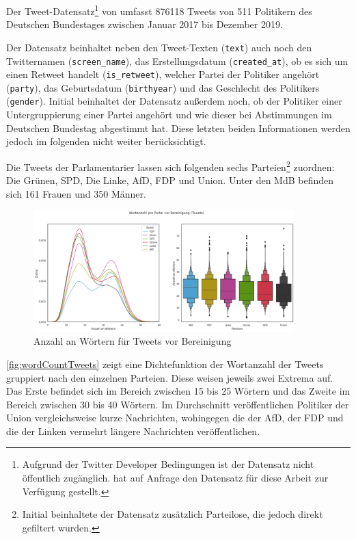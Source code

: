 Der Tweet-Datensatz\footnote{Aufgrund der Twitter Developer Bedingungen ist der Datensatz nicht öffentlich zugänglich. \citeauthor{saltzer_finding_2022} hat auf Anfrage den Datensatz für diese Arbeit zur Verfügung gestellt.} von \textcite{saltzer_finding_2022} umfasst \num{876118} Tweets von \num{511} Politikern des Deutschen Bundestages zwischen Januar \num{2017} bis Dezember \num{2019}. 

Der Datensatz beinhaltet neben den Tweet-Texten (\texttt{text}) auch noch den Twitternamen (\texttt{screen\_name}), das Erstellungsdatum (\texttt{created\_at}), ob es sich um einen Retweet handelt (\texttt{is\_retweet}), welcher Partei der Politiker angehört (\texttt{party}), das Geburtsdatum (\texttt{birthyear}) und das Geschlecht des Politikers (\texttt{gender}). Initial beinhaltet der Datensatz außerdem noch, ob der Politiker einer Untergruppierung einer Partei angehört und wie dieser bei Abstimmungen im Deutschen Bundestag abgestimmt hat. Diese letzten beiden Informationen werden jedoch im folgenden nicht weiter berücksichtigt.

Die Tweets der Parlamentarier lassen sich folgenden sechs Parteien\footnote{Initial beinhaltete der Datensatz zusätzlich Parteilose, die jedoch direkt gefiltert wurden.} zuordnen: Die Grünen, \ac{SPD}, Die Linke, \ac{AfD}, \ac{FDP} und Union. Unter den \ac{MdB} befinden sich \num{161} Frauen und \num{350} Männer.


\begin{figure}[H]
    \centering
    \includegraphics[width=0.9\textwidth]{data/images/tweets/wortanzahl_pro_partei_vor_bereinigung.png}
    \caption{Anzahl an Wörtern für Tweets vor Bereinigung} \label{fig:wordCountTweets}
\end{figure}


\autoref{fig:wordCountTweets} zeigt eine Dichtefunktion der Wortanzahl der Tweets gruppiert nach den einzelnen Parteien. Diese weisen jeweils zwei Extrema auf. Das Erste befindet sich im Bereich zwischen \num{15} bis \num{25} Wörtern und das Zweite im Bereich zwischen \num{30} bis \num{40} Wörtern. Im Durchschnitt veröffentlichen Politiker der Union vergleichsweise kurze Nachrichten, wohingegen die der \ac{AfD}, der \ac{FDP} und die der Linken vermehrt längere Nachrichten veröffentlichen.

